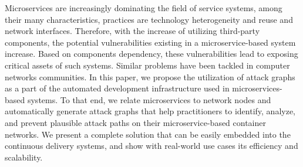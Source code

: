 
Microservices are increasingly dominating the field of service systems, among their many characteristics, practices are technology heterogeneity and reuse and network interfaces. Therefore, with the increase of utilizing third-party components, the potential vulnerabilities existing in a microservice-based system increase. Based on components dependency, these vulnerabilities lead to exposing critical assets of such systems. Similar problems have been tackled in computer networks communities. In this paper, we propose the utilization of attack graphs as a part of the automated development infrastructure used in microservices-based systems. To that end, we relate microservices to network nodes and automatically generate attack graphs that help practitioners to identify, analyze, and prevent plausible attack paths on their microservice-based container networks. We present a complete solution that can be easily embedded into the continuous delivery systems, and show with real-world use cases its efficiency and scalability. 
